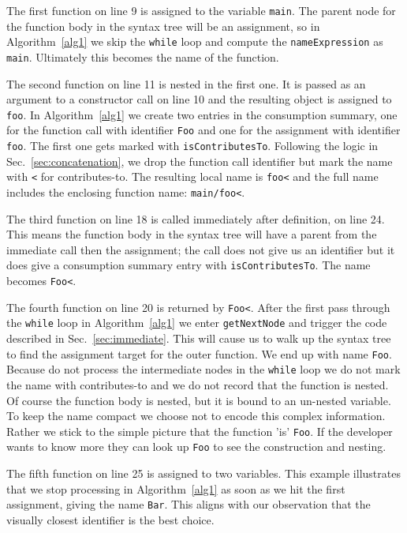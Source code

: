 \documentclass[10pt, preprint]{sigplanconf}
\begin{document}
The first function on line 9 is assigned to the variable \verb|main|. The parent node for the function body in the syntax tree will be an assignment, so in Algorithm~\ref{alg1} we skip the \verb|while| loop and compute the \verb|nameExpression| as \verb|main|.  Ultimately this becomes the name of the function.

The second function on line 11 is nested in the first one.  It is passed as an argument to a constructor call on line 10 and the resulting object is assigned to \verb|foo|. In Algorithm~\ref{alg1} we create two entries in the consumption summary, one for the function call with identifier \verb|Foo| and one for the assignment with identifier \verb|foo|. The first one gets marked with \verb|isContributesTo|.  Following the logic in Sec.~\ref{sec:concatenation}, we drop the function call identifier but mark the name with \verb|<| for contributes-to. The resulting local name is \verb|foo<| and the full name includes the enclosing function name: \verb|main/foo<|.

The third function on line 18 is called immediately after definition, on line 24. This means the function body in the syntax tree will have a parent from the immediate call then the assignment; the call does not give us an identifier but it does give a consumption summary entry with \verb|isContributesTo|. The name becomes \verb|Foo<|.

The fourth function on line 20 is returned by \verb|Foo<|. After the first pass through the \verb|while| loop in Algorithm~\ref{alg1} we enter \verb|getNextNode| and trigger the code described in Sec.~\ref{sec:immediate}.  This will cause us to walk up the syntax tree to find the assignment target for the outer function. We end up with name \verb|Foo|. Because do not process the intermediate nodes in the \verb|while| loop we do not mark the name with contributes-to and we do not record that the function is nested. Of course the function body is nested, but it is bound to an un-nested variable. To keep the name compact we choose not to encode this complex information. Rather we stick to the simple picture that the function 'is' \verb|Foo|. If the developer wants to know more they can look up \verb|Foo| to see the construction and nesting.

The fifth function on line 25 is assigned to two variables. This example illustrates that we stop processing in Algorithm~\ref{alg1} as soon as we hit the first assignment, giving the name \verb|Bar|. This aligns with our observation that the visually closest identifier is the best choice.
\end{document}
